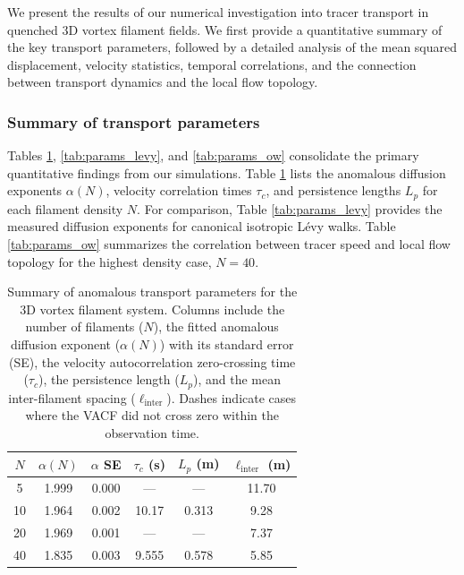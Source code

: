 \documentclass[]{article}
\begin{document}
We present the results of our numerical investigation into tracer transport in quenched 3D vortex filament fields. We first provide a quantitative summary of the key transport parameters, followed by a detailed analysis of the mean squared displacement, velocity statistics, temporal correlations, and the connection between transport dynamics and the local flow topology.

\subsubsection{Summary of transport parameters}

Tables \ref{tab:params_vortex}, \ref{tab:params_levy}, and \ref{tab:params_ow} consolidate the primary quantitative findings from our simulations. Table \ref{tab:params_vortex} lists the anomalous diffusion exponents $\alpha(N)$, velocity correlation times $\tau_c$, and persistence lengths $L_p$ for each filament density $N$. For comparison, Table \ref{tab:params_levy} provides the measured diffusion exponents for canonical isotropic L\'evy walks. Table \ref{tab:params_ow} summarizes the correlation between tracer speed and local flow topology for the highest density case, $N=40$.

\begin{table}[h!]
\centering
\caption{Summary of anomalous transport parameters for the 3D vortex filament system. Columns include the number of filaments ($N$), the fitted anomalous diffusion exponent ($\alpha(N)$) with its standard error (SE), the velocity autocorrelation zero-crossing time ($\tau_c$), the persistence length ($L_p$), and the mean inter-filament spacing ($\ell_{\text{inter}}$). Dashes indicate cases where the VACF did not cross zero within the observation time.}
\label{tab:params_vortex}
\begin{tabular}{cccccc}
\hline
$N$ & $\alpha(N)$ & $\alpha$ SE & $\tau_c$ (s) & $L_p$ (m) & $\ell_{\text{inter}}$ (m) \\
\hline
5  & 1.999 & 0.000 & ---     & ---     & 11.70 \\
10 & 1.964 & 0.002 & 10.17 & 0.313 & 9.28  \\
20 & 1.969 & 0.001 & ---     & ---     & 7.37  \\
40 & 1.835 & 0.003 & 9.555 & 0.578 & 5.85  \\
\hline
\end{tabular}
\end{table}
\end{document}
